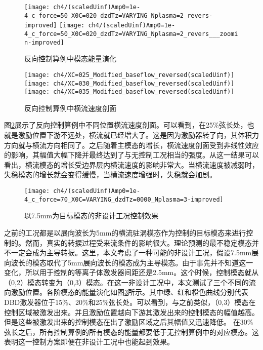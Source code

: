 \begin{figure}
\centering
\texttt{[image: ch4/(scaledUinf)Amp0=1e-4\_c\_force=50\_X0C=020\_dzdTz=VARYING\_Nplasma=2\_revers-improved]}
\texttt{[image: ch4/(scaledUinf)Amp0=1e-4\_c\_force=50\_X0C=020\_dzdTz=VARYING\_Nplasma=2\_revers\_\_\_zoomin-improved]}
\caption{反向控制算例中模态能量演化}%
\label{f:model_energy_revers}
\end{figure}

\begin{figure}
\centering
\texttt{[image: ch4/XC=025\_Modified\_baseflow\_reversed(scaledUinf)]}
\texttt{[image: ch4/XC=030\_Modified\_baseflow\_reversed(scaledUinf)]}
\texttt{[image: ch4/XC=035\_Modified\_baseflow\_reversed(scaledUinf)]}
\caption{反向控制算例中横流速度剖面}%
\label{f:inverse_meanflow}
\end{figure}

图\ref{f:inverse_meanflow}展示了反向控制算例中不同位置横流速度剖面。可以看到，在25\%弦长处，也就是激励位置下游不远处，横流就已经增大了。这是因为激励器转了向，其体积力方向就与横流方向相同了。之后随着主模态的增长，横流速度剖面受到非线性效应的影响，其幅值大幅下降并最终达到了与无控制工况相当的强度。从这一结果可以看出，横流模态的增长受边界层内横流速度的影响非常大。当横流速度被减弱时，失稳模态的增长就会变得缓慢，当横流速度增强时，失稳就会加剧。
\begin{figure}
\centering
\texttt{[image: ch4/(scaledUinf)Amp0=1e-4\_c\_force=70\_X0C=VARYING\_dzdTz=0000\_Nplasma=3-improved]}
\caption{以7.5mm为目标模态的非设计工况控制效果}%
\label{f:7.5mm}
\end{figure}

之前的工况都是以展向波长为5mm的横流驻涡模态作为控制的目标模态来进行控制的。然而，真实的转捩过程受来流条件的影响很大。理论预测的最不稳定模态并不一定会成为主导转捩。这里，本文考虑了一种可能的非设计工况，假设7.5mm展向波长的模态取代了5mm展向波长的模态成为主导模态。由于事先并不知道这一变化，所以用于控制的等离子体激发器间距还是2.5mm。这个时候，控制模态就从（0,2）模态转变为（0,3）模态。在这一非设计工况中，本文测试了三个不同的流向激励位置。各阶模态的能量演化如图\ref{f:7.5mm}所示。其中绿、红和橙色曲线分别代表DBD激发器位于15\%、20\%和25\%弦长处。可以看到，与之前类似，（0,3）模态在控制区域被激发出来。并且激励位置越向下游其激发出来的控制模态的幅值越高。但是这些被激发出来的控制模态在出了激励区域之后其幅值又迅速降低。 在30\%弦长之后，所有控制算例的所有模态的能量都要低于无控制算例中的对应模态。这表明这一控制方案即便在非设计工况中也能起到效果。

